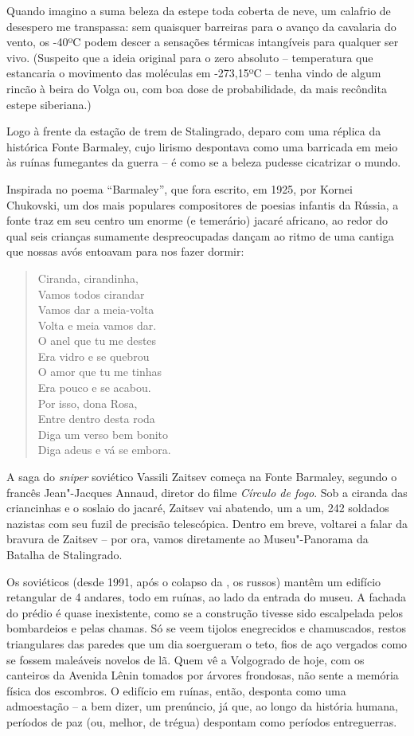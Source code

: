Quando imagino a suma beleza da estepe toda coberta de neve, um calafrio
de desespero me transpassa: sem quaisquer barreiras para o avanço da
cavalaria do vento, os -40ºC podem descer a sensações térmicas intangíveis para qualquer ser vivo. (Suspeito que a ideia original para o zero absoluto -- temperatura que
estancaria o movimento das moléculas em -273,15ºC -- tenha vindo de algum rincão à beira do Volga ou, com boa dose de probabilidade, da mais recôndita estepe siberiana.)

Logo à frente da estação de trem de Stalingrado, deparo com uma réplica
da histórica Fonte Barmaley, cujo lirismo despontava como uma barricada
em meio às ruínas fumegantes da guerra -- é como se a beleza pudesse
cicatrizar o mundo.

Inspirada no poema ``Barmaley'', que fora escrito, em 1925, por Kornei
Chukovski, um dos mais populares compositores de poesias infantis da
Rússia, a fonte traz em seu centro um enorme (e temerário) jacaré
africano, ao redor do qual seis crianças sumamente despreocupadas dançam
ao ritmo de uma cantiga que nossas avós entoavam para nos fazer dormir:

\begin{verse}
Ciranda, cirandinha,\\
Vamos todos cirandar\\
Vamos dar a meia-volta\\
Volta e meia vamos dar.\\[5pt]
O anel que tu me destes\\
Era vidro e se quebrou\\
O amor que tu me tinhas\\
Era pouco e se acabou.\\[5pt]
Por isso, dona Rosa,\\
Entre dentro desta roda\\
Diga um verso bem bonito\\
Diga adeus e vá se embora.
\end{verse}

A saga do \emph{sniper} soviético Vassili Zaitsev começa na Fonte
Barmaley, segundo o francês Jean"-Jacques Annaud, diretor do filme
\emph{Círculo de fogo}. Sob a ciranda das criancinhas e o soslaio do
jacaré, Zaitsev vai abatendo, um a um, 242 soldados nazistas com seu
fuzil de precisão telescópica. Dentro em breve, voltarei a falar da
bravura de Zaitsev -- por ora, vamos diretamente ao Museu"-Panorama da
Batalha de Stalingrado.

Os soviéticos (desde 1991, após o colapso da , os russos) mantêm um
edifício retangular de 4 andares, todo em ruínas, ao lado da entrada do
museu. A fachada do prédio é quase inexistente, como se a construção
tivesse sido escalpelada pelos bombardeios e pelas chamas. Só se veem
tijolos enegrecidos e chamuscados, restos triangulares das paredes que
um dia soergueram o teto, fios de aço vergados como se fossem maleáveis
novelos de lã. Quem vê a Volgogrado de hoje, com os canteiros da Avenida
Lênin tomados por árvores frondosas, não sente a memória física dos
escombros. O edifício em ruínas, então, desponta como uma admoestação --
a bem dizer, um prenúncio, já que, ao longo da história humana, períodos
de paz (ou, melhor, de trégua) despontam como períodos entreguerras.

